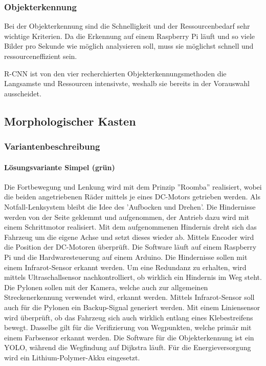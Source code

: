 \documentclass[../main.tex]{subfiles}
\begin{document}
\subsubsection{Objekterkennung}

Bei der Objekterkennung sind die Schnelligkeit und der Ressourcenbedarf sehr wichtige Kriterien.
Da die Erkennung auf einem Raspberry Pi läuft und so viele Bilder pro Sekunde wie möglich analysieren soll, muss sie möglichst schnell und ressourceneffizient sein. 

R-CNN ist von den vier recherchierten Objekterkennungsmethoden die Langsamste und Ressourcen intensivste, weshalb sie bereits in der Vorauswahl ausscheidet.

\newpage
\subsection{Morphologischer Kasten}



    \subsubsection{Variantenbeschreibung}
    \paragraph{Lösungsvariante Simpel (grün)} \label{loesungsvariante_Simpel}
    Die Fortbewegung und Lenkung wird mit dem Prinzip ''Roomba'' realisiert, wobei die beiden angetriebenen Räder mittels je eines DC-Motors getrieben werden. Als Notfall-Lenksystem bleibt die Idee des 'Aufbocken und Drehen'. Die Hindernisse werden von der Seite geklemmt und aufgenommen, der Antrieb dazu wird mit einem Schrittmotor realisiert. Mit dem aufgenommenen Hindernis dreht sich das Fahrzeug um die eigene Achse und setzt dieses wieder ab. Mittels Encoder wird die Position der DC-Motoren überprüft. Die Software läuft auf einem Raspberry Pi und die Hardwaresteuerung auf einem Arduino. Die Hindernisse sollen mit einem Infrarot-Sensor erkannt werden. Um eine Redundanz zu erhalten, wird mittels Ultraschallsensor nachkontrolliert, ob wirklich ein Hindernis im Weg steht. Die Pylonen sollen mit der Kamera, welche auch zur allgemeinen Streckenerkennung verwendet wird, erkannt werden. Mittels Infrarot-Sensor soll auch für die Pylonen ein Backup-Signal generiert werden. Mit einem Liniensensor wird überprüft, ob das Fahrzeug sich auch wirklich entlang eines Klebestreifens bewegt. Dasselbe gilt für die Verifizierung von Wegpunkten, welche primär mit einem Farbsensor erkannt werden. Die Software für die Objekterkennung ist ein YOLO, während die Wegfindung auf Dijkstra läuft. Für die Energieversorgung wird ein Lithium-Polymer-Akku eingesetzt.
\end{document}
